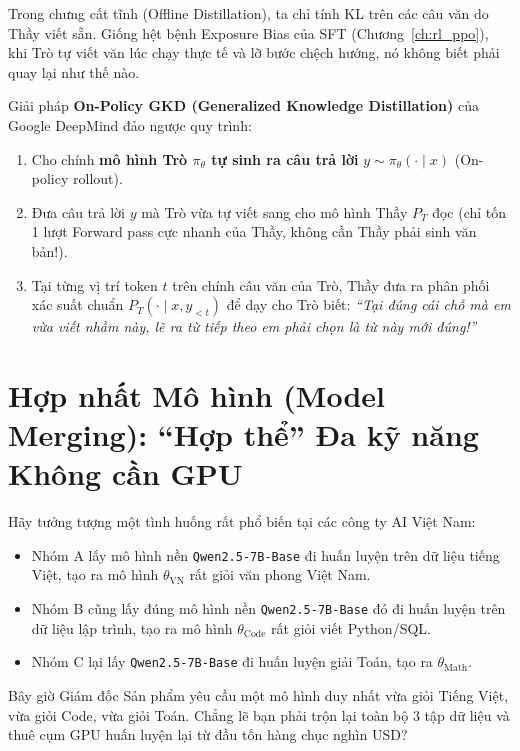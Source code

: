 Trong chưng cất tĩnh (Offline Distillation), ta chỉ tính KL trên các câu văn do Thầy viết sẵn. Giống hệt bệnh Exposure Bias của SFT (Chương~\ref{ch:rl_ppo}), khi Trò tự viết văn lúc chạy thực tế và lỡ bước chệch hướng, nó không biết phải quay lại như thế nào.

Giải pháp \textbf{On-Policy GKD (Generalized Knowledge Distillation)} của Google DeepMind \citep{agarwal2024onpolicy} đảo ngược quy trình:
\begin{enumerate}
  \item Cho chính \textbf{mô hình Trò $\pi_\theta$ tự sinh ra câu trả lời} $y \sim \pi_\theta(\cdot \mid x)$ (On-policy rollout).
  \item Đưa câu trả lời $y$ mà Trò vừa tự viết sang cho mô hình Thầy $P_T$ đọc (chỉ tốn 1 lượt Forward pass cực nhanh của Thầy, không cần Thầy phải sinh văn bản!).
  \item Tại từng vị trí token $t$ trên chính câu văn của Trò, Thầy đưa ra phân phối xác suất chuẩn $P_T(\cdot \mid x, y_{<t})$ để dạy cho Trò biết: \textit{``Tại đúng cái chỗ mà em vừa viết nhầm này, lẽ ra từ tiếp theo em phải chọn là từ này mới đúng!''}
\end{enumerate}

\section{Hợp nhất Mô hình (Model Merging): ``Hợp thể'' Đa kỹ năng Không cần GPU}
\label{sec:model_merging}

Hãy tưởng tượng một tình huống rất phổ biến tại các công ty AI Việt Nam:
\begin{itemize}
  \item Nhóm A lấy mô hình nền \texttt{Qwen2.5-7B-Base} đi huấn luyện trên dữ liệu tiếng Việt, tạo ra mô hình $\theta_{\text{VN}}$ rất giỏi văn phong Việt Nam.
  \item Nhóm B cũng lấy đúng mô hình nền \texttt{Qwen2.5-7B-Base} đó đi huấn luyện trên dữ liệu lập trình, tạo ra mô hình $\theta_{\text{Code}}$ rất giỏi viết Python/SQL.
  \item Nhóm C lại lấy \texttt{Qwen2.5-7B-Base} đi huấn luyện giải Toán, tạo ra $\theta_{\text{Math}}$.
\end{itemize}
Bây giờ Giám đốc Sản phẩm yêu cầu một mô hình duy nhất vừa giỏi Tiếng Việt, vừa giỏi Code, vừa giỏi Toán. Chẳng lẽ bạn phải trộn lại toàn bộ 3 tập dữ liệu và thuê cụm GPU huấn luyện lại từ đầu tốn hàng chục nghìn USD?

